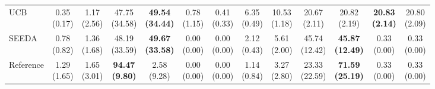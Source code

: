 {\begin{tabular}{l|cccccc|cccccc}
UCB & \makecell{0.35 \\ (0.17)} & \makecell{1.17 \\ (2.56)} & {\cellcolor[HTML]{C8E6C9}} \makecell{47.75 \\ (34.58)} & \bfseries \makecell{49.54 \\ (34.44)} & \makecell{0.78 \\ (1.15)} & \makecell{0.41 \\ (0.33)} & \makecell{6.35 \\ (0.49)} & \makecell{10.53 \\ (1.18)} & {\cellcolor[HTML]{C8E6C9}} \makecell{20.67 \\ (2.11)} & \makecell{20.82 \\ (2.19)} & \bfseries \makecell{20.83 \\ (2.14)} & \makecell{20.80 \\ (2.09)} \\
SEEDA & \makecell{0.78 \\ (0.82)} & \makecell{1.36 \\ (1.68)} & {\cellcolor[HTML]{C8E6C9}} \makecell{48.19 \\ (33.59)} & \bfseries \makecell{49.67 \\ (33.58)} & \makecell{0.00 \\ (0.00)} & \makecell{0.00 \\ (0.00)} & \makecell{2.12 \\ (0.43)} & \makecell{5.61 \\ (2.00)} & {\cellcolor[HTML]{C8E6C9}} \makecell{45.74 \\ (12.42)} & \bfseries \makecell{45.87 \\ (12.49)} & \makecell{0.33 \\ (0.00)} & \makecell{0.33 \\ (0.00)} \\
Reference & \makecell{1.29 \\ (1.65)} & \makecell{1.65 \\ (3.01)} & {\cellcolor[HTML]{C8E6C9}} \bfseries \makecell{94.47 \\ (9.80)} & \makecell{2.58 \\ (9.28)} & \makecell{0.00 \\ (0.00)} & \makecell{0.00 \\ (0.00)} & \makecell{1.14 \\ (0.84)} & \makecell{3.27 \\ (2.80)} & {\cellcolor[HTML]{C8E6C9}} \makecell{23.33 \\ (22.59)} & \bfseries \makecell{71.59 \\ (25.19)} & \makecell{0.33 \\ (0.00)} & \makecell{0.33 \\ (0.00)} \\

\end{tabular}}
